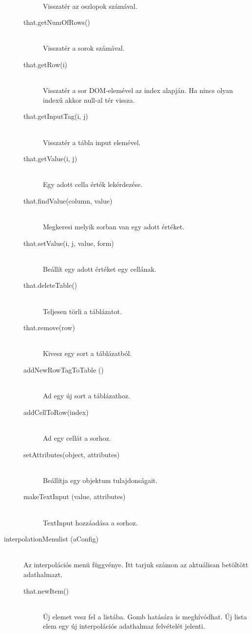 \begin{description}
\begin{description}
			 	\hfill \\ Visszatér az oszlopok számával.
			\item[that.getNumOfRows()]
				\hfill \\ Visszatér a sorok számával.
			\item[that.getRow(i)]
				\hfill \\ Visszatér a sor DOM-elemével az index alapján.\newline
				Ha nincs olyan indexű akkor null-al tér vissza.
			\item[that.getInputTag(i, j)]
				\hfill \\ Visszatér a tábla input elemével.
			\item[that.getValue(i, j)]
				\hfill \\ Egy adott cella érték lekérdezése.
			\item[that.findValue(column, value)] 
				\hfill \\ Megkeresi melyik sorban van egy adott értéket.
			\item[that.setValue(i, j, value, form)]
				\hfill \\ Beállít egy adott értéket egy cellának.
			\item[that.deleteTable()]
				\hfill \\ Teljesen törli a táblázatot.
			\item[that.remove(row)]
				\hfill \\ Kivesz egy sort a táblázatból.
			\item[addNewRowTagToTable ()]
				\hfill \\ Ad egy új sort a táblázathoz.
			\item[addCellToRow(index)]
				\hfill \\ Ad  egy cellát a sorhoz.
			\item[setAttributes(object, attributes)]
				\hfill \\ Beállítja egy objektum tulajdonságait.
			\item[makeTextInput (value,  attributes)]
				\hfill \\  
				TextInput hozzáadása a sorhoz.
			\end{description}
		\item[interpolationMenulist (aConfig)] 
			\hfill \\ 
			Az interpolációs menü függvénye. Itt tarjuk számon az aktuálisan betöltött adathalmazt.
			\begin{description}
			\item[that.newItem()] 
			\hfill \\ Új elemet vesz fel a listába. Gomb hatására is meghívódhat. \newline Új lista elem egy új interpolációs adathalmaz felvételét jelenti.  

\end{description}
\end{description}
